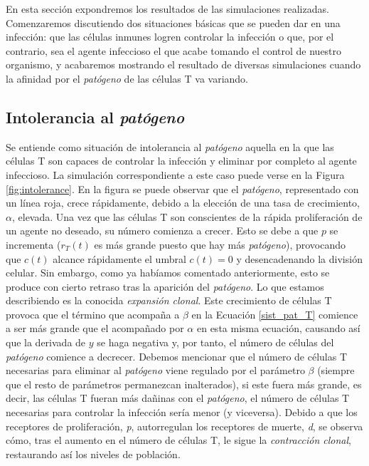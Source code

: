 En esta sección expondremos los resultados de las simulaciones realizadas. Comenzaremos discutiendo dos situaciones básicas que se pueden dar en una infección: que las células inmunes logren controlar la infección o que, por el contrario, sea el agente infeccioso el que acabe tomando el control de nuestro organismo, y acabaremos mostrando el resultado de diversas simulaciones cuando la afinidad por el \textit{patógeno} de las células T va variando.

\subsection{Intolerancia al \textit{patógeno}}
\label{sim:intoler}

Se entiende como situación de intolerancia al \textit{patógeno} aquella en la que las células T son capaces de controlar la infección y eliminar por completo al agente infeccioso. La simulación correspondiente a este caso puede verse en la Figura \ref{fig:intolerance}. En la figura se puede observar que el \textit{patógeno}, representado con un línea roja, crece rápidamente, debido a la elección de una tasa de crecimiento, $\alpha$, elevada. Una vez que las células T son conscientes de la rápida proliferación de un agente no deseado, su número comienza a crecer. Esto se debe a que $p$ se incrementa ($r_{T}(t)$ es más grande puesto que hay más \textit{patógeno}), provocando que $c(t)$ alcance rápidamente el umbral $c(t) = 0$ y desencadenando la división celular. Sin embargo, como ya habíamos comentado anteriormente, esto se produce con cierto retraso tras la aparición del \textit{patógeno}. Lo que estamos describiendo es la conocida \textit{expansión clonal}. Este crecimiento de células T provoca que el término que acompaña a $\beta$ en la Ecuación \ref{sist_pat_T} comience a ser más grande que el acompañado por $\alpha$ en esta misma ecuación, causando así que la derivada de $y$ se haga negativa y, por tanto, el número de células del \textit{patógeno} comience a decrecer. Debemos mencionar que el número de células T necesarias para eliminar al \textit{patógeno} viene regulado por el parámetro $\beta$ (siempre que el resto de parámetros permanezcan inalterados), si este fuera más grande, es decir, las células T fueran más dañinas con el \textit{patógeno}, el número de células T necesarias para controlar la infección sería menor (y viceversa). Debido a que los receptores de proliferación, \textit{p}, autorregulan los receptores de muerte, \textit{d}, se observa cómo, tras el aumento en el número de células T, le sigue la \textit{contracción clonal}, restaurando así los niveles de población.

